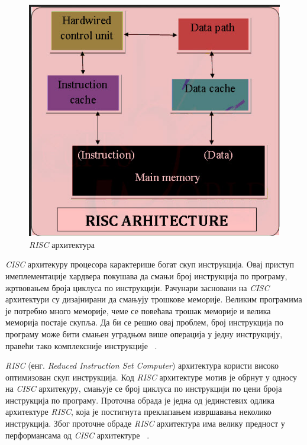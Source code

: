 \documentclass[12pt,oneside]{memoir}
\begin{document}
\begin{figure}[h!]
\begin{center}
\includegraphics[scale=0.75]{slika23.jpg}
\end{center}
\caption{\textit{RISC} архитектура}
\label{fig:main}
\end{figure}

\indent \textit{CISC} архитекуру процесора карактерише богат скуп инструкција. Овај приступ имеплементације хардвера покушава да смањи број инструкција по програму, жртвовањем броја циклуса по инструкцији. Рачунари засновани на \textit{CISC} архитектури су дизајнирани да смањују трошкове меморије. Великим програмима је потребно много меморије, чеме се повећава трошак меморије и велика меморија постаје скупља. Да би се решио овај проблем, број инструкција по програму може бити смањен уградњом више операција у једну инструкцију, правећи тако комплексније инструкције ~\cite{rcRef}.

\indent \textit{RISC} (енг. \textit{Reduced Instruction Set Computer}) архитектура користи високо оптимизован скуп инструкција. Код \textit{RISC} архитектуре мотив је обрнут у односу на \textit{CISC} архитекуру, смањује се број циклуса по инструкцији по цени броја инструкција по програму. Проточна обрада је једна од јединстевих одлика архитектуре \textit{RISC}, која је постигнута преклапањем извршавања неколико инструкција. Због проточне обраде \textit{RISC} архитектура има велику предност у перформансама од \textit{CISC} архитектуре ~\cite{rcRef}.
\end{document}
